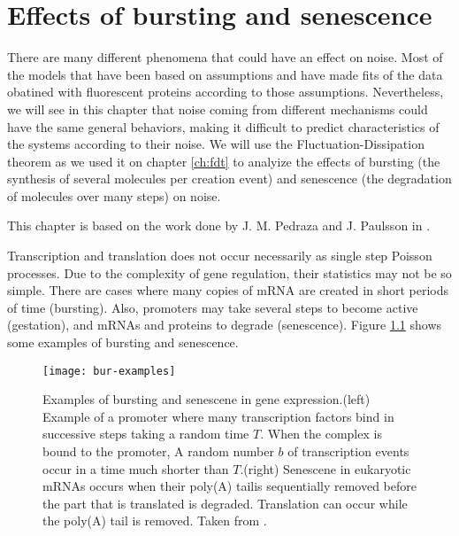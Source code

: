 \chapter{Effects of bursting and senescence}

There are many different phenomena that could have an effect on noise. Most of the models that have been based on assumptions and have made fits of the data obatined with fluorescent proteins according to those assumptions. Nevertheless, we will see in this chapter that noise coming from different mechanisms could have the same general behaviors, making it difficult to predict characteristics of the systems according to their noise. We will use the Fluctuation-Dissipation theorem as we used it on chapter \ref{ch:fdt} to analyize the effects of bursting (the synthesis of several molecules per creation event) and senescence (the degradation of molecules over many steps) on noise.

This chapter is based on the work done by J. M. Pedraza and J. Paulsson in \cite{pedraza08}.

Transcription and translation does not occur necessarily as single step Poisson processes. Due to the complexity of gene regulation, their statistics may not be so simple. There are cases where many copies of mRNA are created in short periods of time (bursting). Also, promoters may take several steps to become active (gestation), and mRNAs and proteins to degrade (senescence). Figure \ref{fig:bur-examples} shows some examples of bursting and senescence.

\begin{figure}[H]
  \centering
  \texttt{[image: bur-examples]}
  \caption[Examples of bursting and senescence in gene expression]{\label{fig:bur-examples} Examples of bursting and senescene in gene expression.(left) Example of a promoter where many transcription factors bind in successive steps taking a random time $T$. When the complex is bound to the promoter, A random number $b$ of transcription events occur in a time much shorter than $T$.(right) Senescene in eukaryotic mRNAs occurs when their poly(A) tail\footnotemark is sequentially removed before the part that is translated is degraded. Translation can occur while the poly(A) tail is removed. Taken from \cite{pedraza08}.}
\end{figure}


